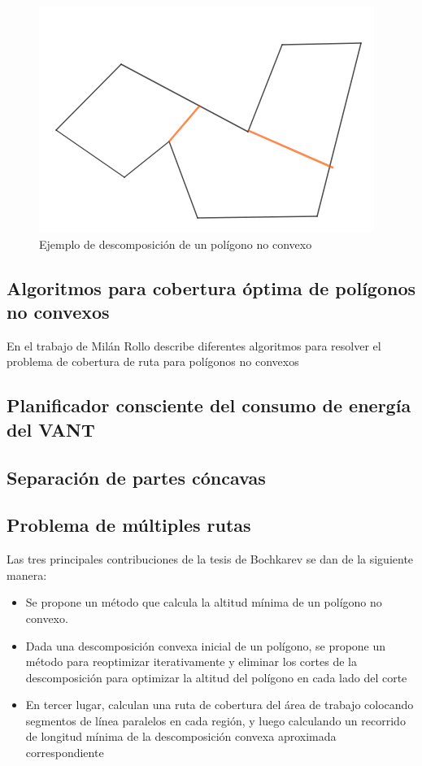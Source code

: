\documentclass[]{report}
\begin{document}
\cite{torres2016}
\begin{figure}[!h]
	\centering
	\includegraphics[width=.4\textwidth]{no_convex_polygon}
	\caption{Ejemplo de descomposición de un polígono no convexo}
	\label{descomposition_polygon}
\end{figure}

\subsection{Algoritmos para cobertura óptima de polígonos no convexos}
En el trabajo de Milán Rollo describe diferentes algoritmos para resolver el problema de cobertura de ruta para polígonos no convexos \cite{pereira2014}
\subsection{Planificador consciente del consumo de energía del VANT}

\subsection{Separación de partes cóncavas}

\subsection{Problema de múltiples rutas}


Las tres principales contribuciones de la tesis de Bochkarev se dan de la siguiente manera:
\begin{itemize}
	\item Se propone un método que calcula la altitud mínima de un polígono no convexo.
	\item Dada una descomposición convexa inicial de un polígono, se propone un método para reoptimizar iterativamente y eliminar los cortes de la descomposición para optimizar la altitud del polígono en cada lado del corte  
	\item En tercer lugar, calculan una ruta de cobertura del área de trabajo colocando segmentos de línea paralelos en cada región, y luego calculando un recorrido de longitud mínima de la descomposición convexa aproximada correspondiente
\end{itemize} \cite{bochkarev2017}
\end{document}

